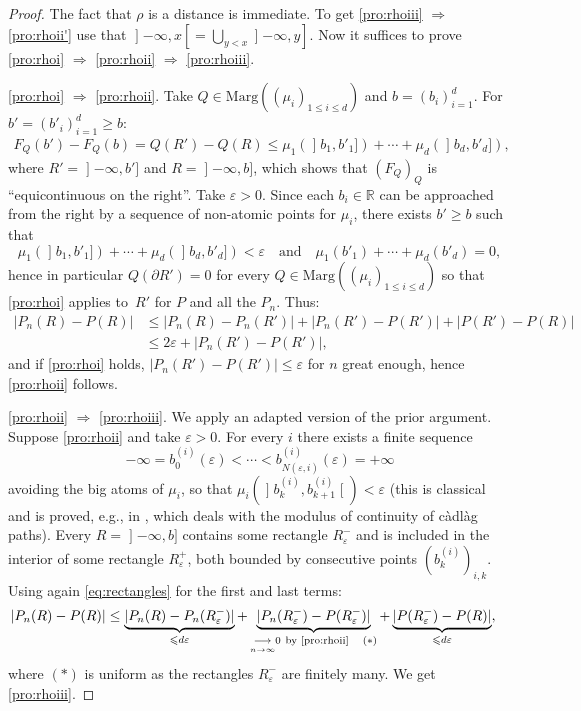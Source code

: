 \documentclass[JEP,XML,SOM,Unicode,NoEqCountersInSection,NoFloatCountersInSection,published]{cedram}
\theoremstyle{plain}
\theoremstyle{definition}
\let\eps\varepsilon
\newcommand{\ma}{\mathrm{Marg}}
\newcommand{\R}{\mathbb{R}}
\newcommand{\AND}{\quad\text{and}\quad}
\newcommand{\op}{\mathopen}
\newcommand{\clo}{\mathclose}
\begin{document}
\begin{proof} The fact that $\rho$ is a distance is immediate. To get \eqref{pro:rhoiii} $\Rightarrow$ \eqref{pro:rhoii'} use that $\op]-\infty,x\clo[=\bigcup_{y<x}\op]-\infty,y]$. Now it suffices to prove \eqref{pro:rhoi} $\Rightarrow$ \eqref{pro:rhoii} $\Rightarrow$ \eqref{pro:rhoiii}.

\eqref{pro:rhoi} $\Rightarrow$ \eqref{pro:rhoii}. Take $Q\in\ma((\mu_i)_{1\leq i\leq d})$ and $b=(b_i)_{i=1}^d$. For $b'=(b'_i)_{i=1}^d\geq b$:
\begin{align}\label{eq:rectangles}
F_Q(b')-F_Q(b)=Q(R')-Q(R)\leq \mu_1(\op]b_1,b'_1])+\cdots+ \mu_d(\op]b_d,b'_d]),
\end{align}
where $R'=\op]-\infty,b']$ and $R=\op]-\infty,b]$, which shows that $(F_Q)_Q$ is ``equicontinuous on the right''. Take $\eps>0$. Since each $b_i\in \R$ can be approached from the right by a sequence of non-atomic points for $\mu_i$, there exists $b'\geqslant b$ such that
\[
\mu_1(\op]b_1,b'_1])+\cdots+ \mu_d(\op]b_d,b'_d])<\eps\AND \mu_1(b'_1)+\cdots+ \mu_d(b'_d)=0,
\]
hence in particular $Q(\partial R')=0$ for every $Q\in \ma((\mu_i)_{1\leq i\leq d})$ so that \eqref{pro:rhoi} applies to~$R'$ for $P$ and all the $P_n$. Thus:\vspace*{-3pt}
\begin{align*}
|P_n(R)- P(R)|&\leq|P_n(R)- P_n(R')|+|P_n(R')-P(R')|+|P(R')- P(R)|\\
&\leq 2\eps+|P_n(R')-P(R')|,
\end{align*}
and if \eqref{pro:rhoi} holds, $|P_n(R')-P(R')|\leqslant\eps$ for $n$ great enough, hence \eqref{pro:rhoii} follows.

\eqref{pro:rhoii} $\Rightarrow$ \eqref{pro:rhoiii}. We apply an adapted version of the prior argument. Suppose \eqref{pro:rhoii} and take $\eps>0$. For every $i$ there exists a finite sequence\vspace*{-3pt}
\[
-\infty=b_0^{(i)}(\eps)<\cdots< b^{(i)}_{N(\eps,i)}(\eps)=+\infty
\]
avoiding the big atoms of $\mu_i$, \ie so that $\mu_i(\op]b_k^{(i)},b_{k+1}^{(i)}\clo[)< \eps$ (this is classical and is proved, e.g., in \cite[\S 12]{Bi}, which deals with the modulus of continuity of càdlàg paths). Every $R=\op]-\infty,b]$ contains some rectangle $R^-_\eps$ and is included in the interior of some rectangle $R^+_\eps$, both bounded by consecutive points $(b^{(i)}_k)_{i,k}$. Using again \eqref{eq:rectangles} for the first and last terms:
\begin{align*}
|P_n(R)- P(R)|&\leq\underbrace{|P_n(R)- P_n(R_\eps^-)|}_{\leqslant d\eps}+\underbrace{|P_n(R_\eps^-)-P(R_\eps^-)|}_{\underset{n\to\infty}\longrightarrow0\ \text{by \eqref{pro:rhoii}}\quad\text{\bf$(\ast)$}}+\underbrace{|P(R_\eps^-)- P(R)|}_{\leqslant d\eps},
\end{align*}
where {\bf$(\ast)$} is uniform as the rectangles $R_\eps^-$ are finitely many. We get \eqref{pro:rhoiii}.
\end{proof}
\end{document}
